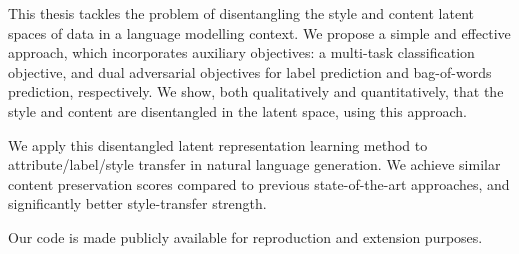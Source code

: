 This thesis tackles the problem of disentangling the style and content latent spaces of data in a language modelling context. We propose a simple and effective approach, which incorporates auxiliary objectives: a multi-task classification objective, and dual adversarial objectives for label prediction and bag-of-words prediction, respectively. We show, both qualitatively and quantitatively, that the style and content are disentangled in the latent space, using this approach.

We apply this disentangled latent representation learning method to attribute/label/style transfer in natural language generation. We achieve similar content preservation scores compared to previous state-of-the-art approaches, and significantly better style-transfer strength.

Our code is made publicly available for reproduction and extension purposes.
